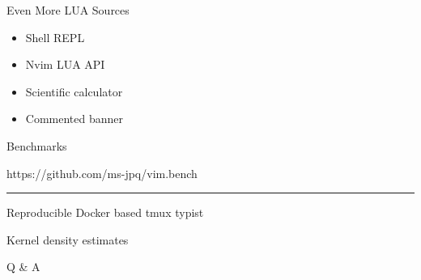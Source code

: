 \documentclass{beamer}
\begin{document}
\begin{frame}{Even More LUA Sources}

	\begin{itemize}

		\item Shell REPL

		\item Nvim LUA API

		\item Scientific calculator
		
		\item Commented banner

	\end{itemize}

\end{frame}


\begin{frame}{Benchmarks}

	https://github.com/ms-jpq/vim.bench

	\rule{\textwidth}{0.1em}

	Reproducible Docker based tmux typist

	Kernel density estimates

\end{frame}


\begin{frame}[standout]

	Q \& A

\end{frame}
\end{document}

